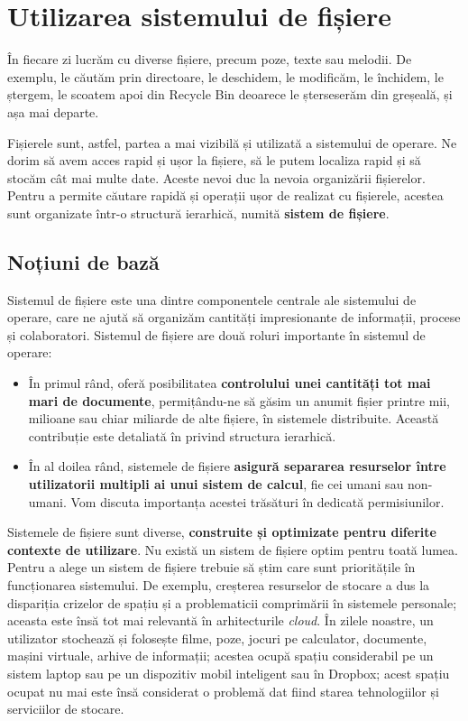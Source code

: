 \chapter{Utilizarea sistemului de fișiere}
\label{chapter:fs}

În fiecare zi lucrăm cu diverse fișiere, precum poze, texte sau melodii. De exemplu, le
căutăm prin directoare, le deschidem, le modificăm, le închidem, le ștergem, le
scoatem apoi din Recycle Bin deoarece le șterseserăm din greșeală, și așa mai
departe.

Fișierele sunt, astfel, partea a mai vizibilă și utilizată a sistemului de operare. Ne dorim să avem acces rapid și ușor la fișiere, să le putem localiza rapid și să stocăm cât mai multe date. Aceste nevoi duc la nevoia organizării fișierelor. Pentru a permite căutare rapidă și operații ușor de realizat cu fișierele, acestea sunt organizate într-o structură ierarhică, numită \textbf{sistem de fișiere}.

\section{Noțiuni de bază}
\label{sec:fs:concepts}

Sistemul de fișiere este una dintre componentele centrale ale sistemului de operare, care ne ajută să organizăm cantități impresionante de informații, procese și colaboratori. Sistemul de fișiere are două roluri importante în sistemul de operare:

\begin{itemize}
  \item În primul rând, oferă posibilitatea \textbf{controlului unei cantități tot mai mari de documente}, permițându-ne să găsim un anumit fișier printre mii, milioane sau chiar miliarde de alte fișiere, în sistemele distribuite. Această contribuție este detaliată în  privind structura ierarhică.
  \item În al doilea rând, sistemele de fișiere \textbf{asigură separarea resurselor între utilizatorii multipli ai unui sistem de calcul}, fie cei umani sau non-umani. Vom discuta importanța acestei trăsături în  dedicată permisiunilor.
\end{itemize}

Sistemele de fișiere sunt diverse, \textbf{construite și optimizate pentru diferite contexte de utilizare}. Nu există un sistem de fișiere optim pentru toată lumea. Pentru a alege un sistem de fișiere trebuie să știm care sunt prioritățile în funcționarea sistemului. De exemplu, creșterea resurselor de stocare a dus la dispariția crizelor de spațiu și a problematicii comprimării în sistemele personale; aceasta este însă tot mai relevantă în arhitecturile \textit{cloud}. În zilele noastre, un utilizator stochează și folosește filme, poze, jocuri pe calculator, documente, mașini virtuale, arhive de informații; acestea ocupă spațiu considerabil pe un sistem laptop sau pe un dispozitiv mobil inteligent sau în Dropbox; acest spațiu ocupat nu mai este însă considerat o problemă dat fiind starea tehnologiilor și serviciilor de stocare.

